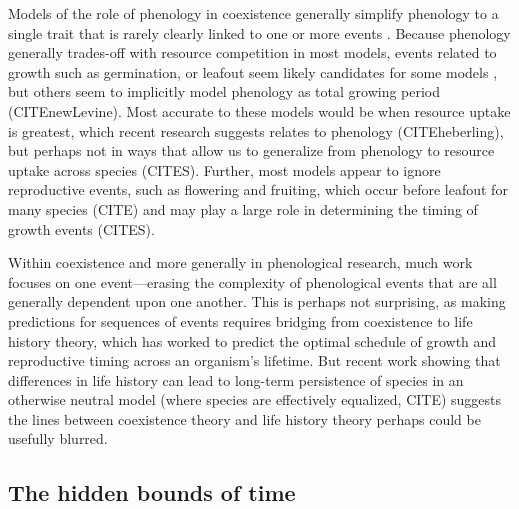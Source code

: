 \documentclass[11pt]{article}
\begin{document}
Models of the role of phenology in coexistence generally simplify phenology to a single trait that is rarely clearly linked to one or more events \citep[even when studied with empirical data][]{godoy2014} . Because phenology generally trades-off with resource competition in most models, events related to growth such as germination, or leafout seem likely candidates for some models \citep[e.g.,][]{godoy2014,memegan2021}, but others seem to implicitly model phenology as total growing period (CITEnewLevine). Most accurate to these models would be when resource uptake is greatest, which recent research suggests relates to phenology (CITEheberling), but perhaps not in ways that allow us to generalize from phenology to resource uptake across species (CITES). Further, most models appear to ignore reproductive events, such as flowering and fruiting, which occur before leafout for many species (CITE) and may play a large role in determining the timing of growth events (CITES). 

Within coexistence and more generally in phenological research, much work focuses on one event---erasing the complexity of phenological events that are all generally dependent upon one another. This is perhaps not surprising, as making predictions for sequences of events requires bridging from coexistence to life history theory, which has worked to predict the optimal schedule of growth and reproductive timing across an organism's lifetime. But recent work showing that differences in life history can lead to long-term persistence of species in an otherwise neutral model (where species are effectively equalized, CITE) suggests the lines between coexistence theory and life history theory perhaps could be usefully blurred. 


\subsection*{The hidden bounds of time} 


\end{document}
